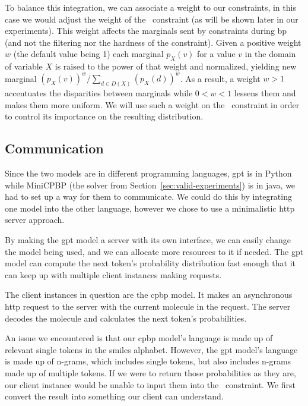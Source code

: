 \documentclass[../Document.tex]{subfiles}
\begin{document}
To balance this integration, we can associate a weight to our constraints, in this case we would adjust the weight of the \oracle\ constraint (as will be shown later in our experiments).
This weight affects the marginals sent by constraints during \gls{bp} (and not the filtering nor the hardness of the constraint).
Given a positive weight $w$ (the default value being 1) each marginal $p_X(v)$ for a value $v$ in the domain of variable $X$ is raised to the power of that weight and normalized, yielding new marginal $(p_X(v))^w / \sum_{d \in D(X)} (p_X(d))^w$.
As a result, a weight $w>1$ accentuates the disparities between marginals
while $0 < w < 1$ lessens them and makes them more uniform.
We will use such a weight on the \oracle\ constraint in order to control its importance on the resulting distribution.


\subsection{Communication}
Since the two models are in different programming languages, \gls{gpt} is in Python while MiniCPBP (the solver from Section~\ref{sec:valid-experiments}) is in java, we had to set up a way for them to communicate.
We could do this by integrating one model into the other language, however we chose to use a minimalistic \gls{http} server approach.

By making the \gls{gpt} model a server with its own interface, we can easily change the model being used, and we can allocate more resources to it if needed.
The \gls{gpt} model can compute the next token's probability distribution fast enough that it can keep up with multiple client instances making requests.

The client instances in question are the \gls{cpbp} model. It makes an asynchronous \gls{http} request to the server with the current molecule in the request. The server decodes the molecule and calculates the next token's probabilities.

An issue we encountered is that our \gls{cpbp} model's language is made up of relevant single tokens in the \gls{smiles} alphabet.
However, the \gls{gpt} model's language is made up of n-grams, which includes single tokens, but also includes n-grams made up of multiple tokens.
If we were to return those probabilities as they are, our client instance would be unable to input them into the \oracle\ constraint.
We first convert the result into something our client can understand.
\end{document}
